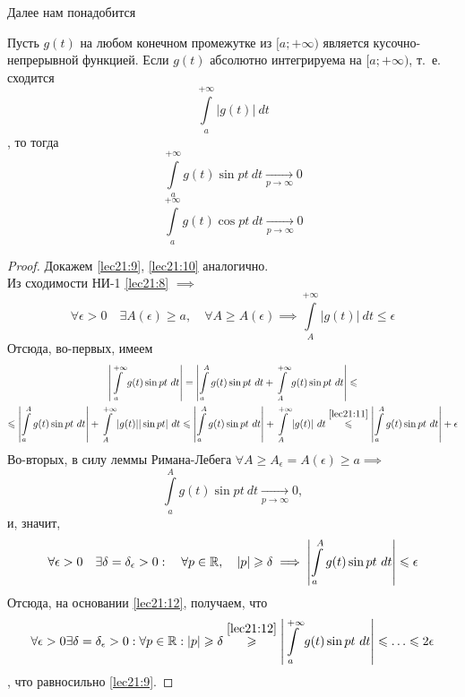 \documentclass[../../main.tex]{subfiles}
\begin{document}
Далее нам понадобится
\begin{thm}
	Пусть $ g(t) $ на любом конечном промежутке из $ [a; +\infty) $
	является кусочно-непрерывной функцией. Если $ g(t) $ 
	абсолютно интегрируема на $ [a; +\infty) $, т.~е.
	сходится 
	\begin{equation}
	\label{lec21:8}
	\int\limits_{a}^{+\infty} |g(t)|\ dt
	\end{equation}, то тогда
	\begin{equation}
	\label{lec21:9}
	\int\limits_{a}^{+\infty} g(t) \sin pt\ dt
	\underset{p \to \infty}{\to} 0
	\end{equation}
	\begin{equation}
	\label{lec21:10}
	\int\limits_{a}^{+\infty} g(t) \cos pt\ dt
	\underset{p \to \infty}{\to} 0
	\end{equation}
\end{thm}
\begin{proof}
	Докажем \eqref{lec21:9}, \eqref{lec21:10} аналогично.\\
	Из сходимости НИ-1 \eqref{lec21:8} $ \implies $
	\begin{equation}
	\label{lec21:11}
	\forall \epsilon > 0 \quad \exists A(\epsilon) \geq a, \quad
	\forall A \geq A(\epsilon) \implies 
	\int\limits_{A}^{+\infty} |g(t)|\ dt \leq \epsilon
	\end{equation}
	Отсюда, во-первых, имеем
	\begin{equation}
	\label{lec21:12}
	\begin{gathered}
	\left|  
	\int\limits_{a}^{+\infty} g(t) \sin pt\ dt
	\right| = \left|
	\int\limits_{a}^{A} g(t) \sin pt\ dt +
	\int\limits_{A}^{+\infty} g(t) \sin pt\ dt
	\right| \leq \\
	\leq \left|
	\int\limits_{a}^{A} g(t) \sin pt\ dt
	\right| +
	\int\limits_{A}^{+\infty} |g(t)||\sin pt|\ dt \leq
	\left|
	\int\limits_{a}^{A} g(t) \sin pt\ dt
	\right| +
	\int\limits_{A}^{+\infty} |g(t)|\ dt \stackrel{\eqref{lec21:11}}{\leq}
	\left|
	\int\limits_{a}^{A} g(t) \sin pt\ dt
	\right| + \epsilon
	\end{gathered}
	\end{equation}
	Во-вторых, в силу леммы Римана-Лебега 
	$ \forall A \geq A_\epsilon = A(\epsilon) \geq a \implies $
	\[
	\int\limits_{a}^{A} g(t) \sin pt\ dt \underset{p \to \infty}{\to} 0,
	\]
	и, значит,
	\[
	\forall \epsilon > 0 \quad \exists \delta = \delta_\epsilon > 0:\quad
	\forall p \in \mathbb{R},\quad |p| \geqslant \delta \implies
	\left|
	\int\limits_{a}^{A} g(t) \sin pt\ dt
	\right| \leqslant \epsilon
	\]
	Отсюда, на основании \eqref{lec21:12}, получаем, что
	\[
	\forall \epsilon > 0 \exists \delta = \delta_\epsilon > 0: 
	\forall p \in \R: |p| \geq \delta
	\stackrel{\eqref{lec21:12}}{\geq}
	\left|
	\int\limits_{a}^{+\infty} g(t) \sin pt\ dt
	\right| \leq \dots \leq 2\epsilon
	\], что равносильно \eqref{lec21:9}.
\end{proof}
\end{document}
